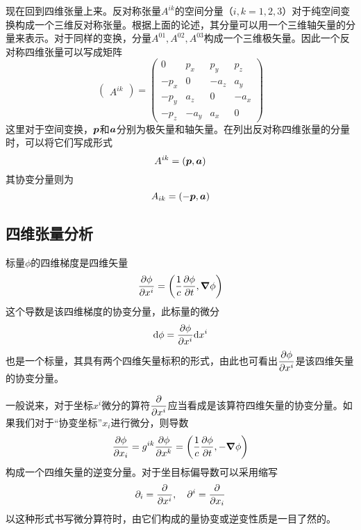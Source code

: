 现在回到四维张量上来。反对称张量$A^{ik}$的空间分量（$i,k=1,2,3$）对于纯空间变换构成一个三维反对称张量。根据上面的论述，其分量可以用一个三维轴矢量的分量来表示。对于同样的变换，分量$A^{01},A^{02},A^{03}$构成一个三维极矢量。因此一个反对称四维张量可以写成矩阵
\begin{equation}
	\begin{pmatrix} A^{ik} \end{pmatrix} = \begin{pmatrix} 0 & p_x & p_y & p_z \\ -p_x & 0 & -a_z & a_y \\ -p_y & a_z & 0 & -a_x \\ -p_z & -a_y & a_x & 0 \end{pmatrix}
\end{equation}
这里对于空间变换，$\boldsymbol{p}$和$\boldsymbol{a}$分别为极矢量和轴矢量。在列出反对称四维张量的分量时，可以将它们写成形式
\begin{equation*}
	A^{ik} = (\boldsymbol{p},\boldsymbol{a})
\end{equation*}
其协变分量则为
\begin{equation*}
	A_{ik} = (-\boldsymbol{p},\boldsymbol{a})
\end{equation*}

\subsection{四维张量分析}

标量$\phi$的四维梯度是四维矢量
\begin{equation*}
	\frac{\partial \phi}{\partial x^i} = \left(\frac{1}{c}\frac{\partial \phi}{\partial t},\boldsymbol{\nabla} \phi\right)
\end{equation*}
这个导数是该四维梯度的协变分量，此标量的微分
\begin{equation*}
	\mathrm{d}\phi = \frac{\partial \phi}{\partial x^i} \mathrm{d}x^i
\end{equation*}
也是一个标量，其具有两个四维矢量标积的形式，由此也可看出$\dfrac{\partial \phi}{\partial x^i}$是该四维矢量的协变分量。

一般说来，对于坐标$x^i$微分的算符$\dfrac{\partial}{\partial x^i}$应当看成是该算符四维矢量的协变分量。如果我们对于“协变坐标”$x_i$进行微分，则导数
\begin{equation*}
	\frac{\partial \phi}{\partial x_i} = g^{ik} \frac{\partial \phi}{\partial x^k} = \left(\frac{1}{c}\frac{\partial \phi}{\partial t},-\boldsymbol{\nabla} \phi\right)
\end{equation*}
构成一个四维矢量的逆变分量。对于坐目标偏导数可以采用缩写
\begin{equation*}
	\partial_i = \frac{\partial}{\partial x^i},\quad \partial^i = \frac{\partial}{\partial x_i}
\end{equation*}
以这种形式书写微分算符时，由它们构成的量协变或逆变性质是一目了然的。

